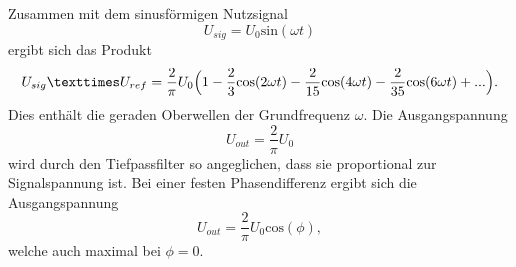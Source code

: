 Zusammen mit dem sinusförmigen Nutzsignal
\begin{equation}
    U_{sig} = U_0 \text{sin}(\omega t)
    \label{eqn:Nutzsignal}
\end{equation}
ergibt sich das Produkt
\begin{equation}
    U_{sig} \texttimes U_{ref} = \frac{2}{\pi} U_0 \Bigl(1-\frac{2}{3}\text{cos}(2\omega t)-\frac{2}{15}\text{cos}(4\omega t)-\frac{2}{35}\text{cos}(6\omega t)+...\Bigr).
\end{equation}
Dies enthält die geraden Oberwellen der Grundfrequenz $\omega$.
Die Ausgangspannung 
\begin{equation}
    U_{out} = \frac{2}{\pi} U_0
\end{equation}
wird durch den Tiefpassfilter so angeglichen, dass sie proportional zur Signalspannung ist.
Bei einer festen Phasendifferenz ergibt sich die Ausgangspannung
\begin{equation}
    U_{out} = \frac{2}{\pi}U_0 \text{cos}(\phi),
\end{equation}
welche auch maximal bei $\phi = 0$.
